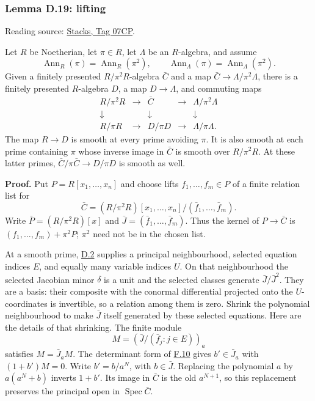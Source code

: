 \documentclass[11pt,a4paper,openany]{report}
\begin{document}
\label{AG-RG-S05-smoothing-lemma-lifting}

\subsubsection{Lemma D.19: lifting}\label{AG-RG-S05-lemma-d.19-lifting}

Reading source: \href{https://stacks.math.columbia.edu/tag/07CP}{Stacks, Tag 07CP}.

Let \(R\) be Noetherian, let \(\pi\in R\), let \(\Lambda\) be an \(R\)-algebra, and assume \[
\operatorname{Ann}_R(\pi)=\operatorname{Ann}_R(\pi^2),
\qquad
\operatorname{Ann}_\Lambda(\pi)=\operatorname{Ann}_\Lambda(\pi^2).
\] Given a finitely presented \(R/\pi^2R\)-algebra \(\bar C\) and a map \(\bar C\to\Lambda/\pi^2\Lambda\), there is a finitely presented \(R\)-algebra \(D\), a map \(D\to\Lambda\), and commuting maps \[
\begin{array}{ccccc}
R/\pi^2R&\longrightarrow&\bar C&\longrightarrow&\Lambda/\pi^2\Lambda\\
\downarrow&&\downarrow&&\downarrow\\
R/\pi R&\longrightarrow&D/\pi D&\longrightarrow&\Lambda/\pi\Lambda.
\end{array}
\] The map \(R\to D\) is smooth at every prime avoiding \(\pi\). It is also smooth at each prime containing \(\pi\) whose inverse image in \(\bar C\) is smooth over \(R/\pi^2R\). At these latter primes, \(\bar C/\pi\bar C\to D/\pi D\) is smooth as well.

\textbf{Proof.} Put \(P=R[x_1,\ldots,x_n]\) and choose lifts \(f_1,\ldots,f_m\in P\) of a finite relation list for \[
\bar C=(R/\pi^2R)[x_1,\ldots,x_n]/(\bar f_1,\ldots,\bar f_m).
\] Write \(\bar P=(R/\pi^2R)[x]\) and \(\bar J=(\bar f_1,\ldots,\bar f_m)\). Thus the kernel of \(P\to\bar C\) is \((f_1,\ldots,f_m)+\pi^2P\); \(\pi^2\) need not be in the chosen list.

At a smooth prime, \hyperref[AG-RG-S05-smoothing-lemma-find-strictly-standard]{D.2} supplies a principal neighbourhood, selected equation indices \(E\), and equally many variable indices \(U\). On that neighbourhood the selected Jacobian minor \(\delta\) is a unit and the selected classes generate \(\bar J/\bar J^2\). They are a basis: their composite with the conormal differential projected onto the \(U\)-coordinates is invertible, so a relation among them is zero. Shrink the polynomial neighbourhood to make \(\bar J\) itself generated by these selected equations. Here are the details of that shrinking. The finite module \[
M=(\bar J/(\bar f_j:j\in E))_a
\] satisfies \(M=\bar J_aM\). The determinant form of \hyperref[AG-RG-S05-algebra-lemma-NAK]{F.10} gives \(b'\in\bar J_a\) with \((1+b')M=0\). Write \(b'=b/a^N\), with \(b\in\bar J\). Replacing the polynomial \(a\) by \(a(a^N+b)\) inverts \(1+b'\). Its image in \(\bar C\) is the old \(a^{N+1}\), so this replacement preserves the principal open in \(\operatorname{Spec}\bar C\).
\end{document}
